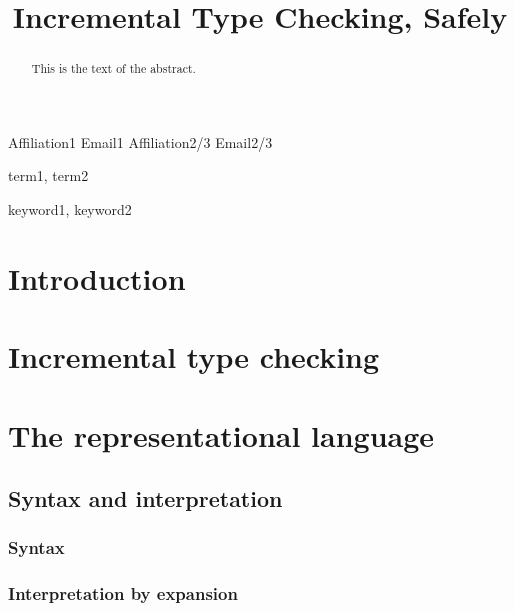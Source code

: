\documentclass[preprint,9pt,authoryear]{sigplanconf}
\begin{document}
\copyrightdata{[to be supplied]} 


\title{Incremental Type Checking, Safely}

           {Affiliation1}
           {Email1}
           {Affiliation2/3}
           {Email2/3}

\maketitle

\begin{abstract}
This is the text of the abstract.
\end{abstract}


\terms
term1, term2

\keywords
keyword1, keyword2

\section{Introduction}

\section{Incremental type checking}

\section{The {\system} representational language}

\subsection{Syntax and interpretation}

\subsubsection{Syntax}

\subsubsection{Interpretation by expansion}
\end{document}
